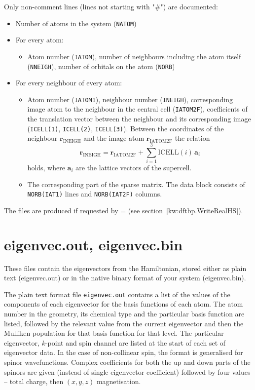 Only non-comment lines (lines not starting with "\#") are documented:
\begin{itemize}
\item Number of atoms in the system (\verb|NATOM|)
\item For every atom:
  \begin{itemize}
  \item Atom number (\verb|IATOM|), number of neighbours including the
    atom itself (\verb|NNEIGH|), number of orbitals on the atom
    (\verb|NORB|)
  \end{itemize}
\item For every neighbour of every atom:
  \begin{itemize}
  \item Atom number (\verb|IATOM1|), neighbour number (\verb|INEIGH|),
    corresponding image atom to the neighbour in the central cell
    (\verb|IATOM2F|), coefficients of the translation vector between
    the neighbour and its corresponding image (\verb|ICELL(1)|,
    \verb|ICELL(2)|, \verb|ICELL(3)|). Between the coordinates of the
    neighbour $\mathbf{r}_{\text{INEIGH}}$ and the image atom
    $\mathbf{r}_{\text{IATOM2F}}$ the relation
    \begin{equation*}
      \mathbf{r}_{\text{INEIGH}} = \mathbf{r}_{\text{IATOM2F}} + \sum_{i=1}^3
      \text{ICELL}(i)\, \mathbf{a}_i
    \end{equation*}
    holds, where $\mathbf{a}_i$ are the lattice vectors of the supercell.
  \item The corresponding part of the sparse matrix. The data block
    consists of \verb|NORB(IAT1)| lines and \verb|NORB(IAT2F)| columns.
  \end{itemize}
\end{itemize}

The files are produced if requested by  = 
(see section~\ref{kw:dftbp.WriteRealHS}).

\section{eigenvec.out, eigenvec.bin}
\label{sec:dftbp.eigenvec}

These files contain the eigenvectors from the Hamiltonian, stored
either as plain text (eigenvec.out) or in the native binary format of
your system (eigenvec.bin).

The plain text format file \verb|eigenvec.out| contains a list of the values of
the components of each eigenvector for the basis functions of each atom. The
atom number in the geometry, its chemical type and the particular basis function
are listed, followed by the relevant value from the current eigenvector and then
the Mulliken population for that basis function for that level. The particular eigenvector, $k$-point and spin
channel are listed at the start of each set of eigenvector data. In the case of
non-collinear spin, the format is generalised for spinor wavefunctions. Complex
coefficients for both the up and down parts of the spinors are given (instead of
single eigenvector coefficient) followed by four values -- total charge, then
$(x,y,z)$ magnetisation.

